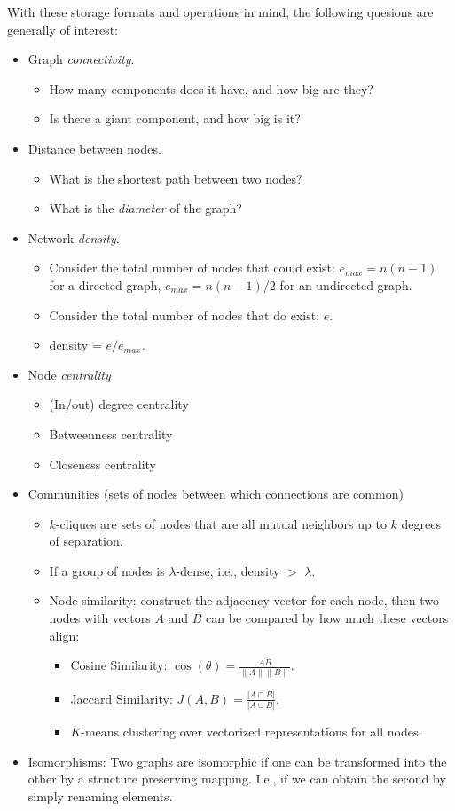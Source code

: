 \documentclass[12pt]{article}
\begin{document}
With these storage formats and operations in mind, the following quesions
are generally of interest:
\begin{itemize}
\item Graph {\it connectivity}.
\begin{itemize}
\item How many components does it have, and how big are they?
\item Is there a giant component, and how big is it?
\end{itemize}
\item Distance between nodes.
\begin{itemize}
\item What is the shortest path between two nodes?
\item What is the {\it diameter} of the graph?
\end{itemize}
\item Network {\it density}.
\begin{itemize}
\item Consider the total number of nodes that could exist: 
$e_{max} = n(n-1)$ for a directed graph, $e_{max} = n(n-1)/2$ for an
undirected graph.
\item Consider the total number of nodes that do exist: $e$.
\item density = $e/e_{max}$.
\end{itemize}
\item Node {\it centrality}
\begin{itemize}
\item (In/out) degree centrality
\item Betweenness centrality
\item Closeness centrality
\end{itemize}
\item Communities (sets of nodes between which connections are common)
\begin{itemize}
\item $k$-cliques are sets of nodes that are all mutual neighbors up to $k$
degrees of separation.
\item If a group of nodes is $\lambda$-dense, i.e., density $>$ $\lambda$.
\item Node similarity: construct the adjacency vector for each node, then
two nodes with vectors $A$ and $B$ can be compared by how much these vectors
align:
\begin{itemize}
\item Cosine Similarity: $\cos(\theta) = \frac{A \dot B}{\|A\|\|B\|}$.
\item Jaccard Similarity: $J(A,B) = \frac{| A \cap B|}{|A \cup B|}$.
\item $K$-means clustering over vectorized representations for all nodes.
\end{itemize}
\end{itemize}
\item Isomorphisms: Two graphs are isomorphic if one can be transformed into
the other by a structure preserving mapping. I.e., if we can obtain the second
by simply renaming elements.
\end{itemize}
\end{document}
